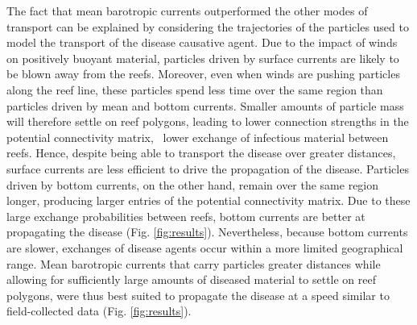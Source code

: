 The fact that mean barotropic currents outperformed the other modes of transport can be explained by considering the trajectories of the particles used to model the transport of the disease causative agent. Due to the impact of winds on positively buoyant material, particles driven by surface currents are likely to be blown away from the reefs. Moreover, even when winds are pushing particles along the reef line, these particles spend less time over the same region than particles driven by mean and bottom currents. Smaller amounts of particle mass will therefore settle on reef polygons, leading to lower connection strengths in the potential connectivity matrix, \ie~lower exchange of infectious material between reefs. Hence, despite being able to transport the disease over greater distances, surface currents are less efficient to drive the propagation of the disease. Particles driven by bottom currents, on the other hand, remain over the same region longer, producing larger entries of the potential connectivity matrix. Due to these large exchange probabilities between reefs, bottom currents are better at propagating the disease (Fig. \ref{fig:results}). Nevertheless, because bottom currents are slower, exchanges of disease agents occur within a more limited geographical range. Mean barotropic currents that carry particles greater distances while allowing for sufficiently large amounts of diseased material to settle on reef polygons, were thus best suited to propagate the disease at a speed similar to field-collected data (Fig. \ref{fig:results}).


